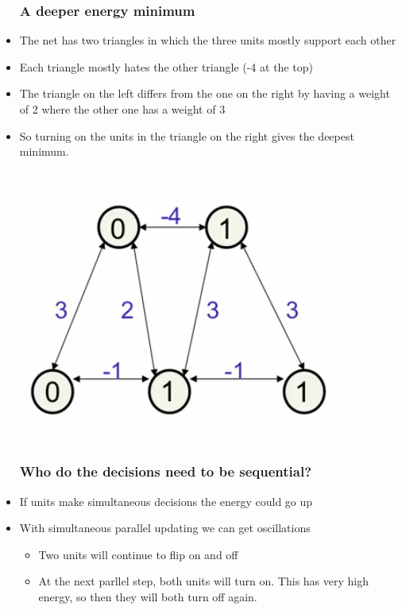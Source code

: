 \begin{itemize}
	\subsubsection{A deeper energy minimum}
	\item The net has two triangles in which the three units mostly support each other
	\item Each triangle mostly hates the other triangle (-4 at the top)
	\item The triangle on the left differs from the one on the right by having a weight of 2 where the other one has a weight of 3
	\item So turning on the units in the triangle on the right gives the deepest minimum.
	\begin{center}
		\includegraphics[scale=0.8]{sections/11/deep.png}
	\end{center}

	\subsubsection{Who do the decisions need to be sequential?}
	\item If units make simultaneous decisions the energy could go up
	\item With simultaneous parallel updating we can get oscillations
	\begin{itemize}
		\item Two units will continue to flip on and off
		\begin{center}
		\end{center}
		\item At the next parllel step, both units will turn on. This has very high energy, so then they will both turn off again.
	\end{itemize}


\end{itemize}
